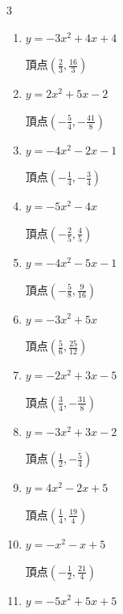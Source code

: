 \begin{multicols}{3}
\begin{enumerate}
        $\displaystyle 頂点\left( 2 , -1 \right)$

  \item $\displaystyle y=-3x^{2}+4x+4$

        $\displaystyle 頂点\left( \frac{2}{3} , \frac{16}{3} \right)$

  \item $\displaystyle y=2x^{2}+5x-2$

        $\displaystyle 頂点\left( -\frac{5}{4} , -\frac{41}{8} \right)$

\columnbreak %

  \item $\displaystyle y=-4x^{2}-2x-1$

        $\displaystyle 頂点\left( -\frac{1}{4} , -\frac{3}{4} \right)$

  \item $\displaystyle y=-5x^{2}-4x$

        $\displaystyle 頂点\left( -\frac{2}{5} , \frac{4}{5} \right)$

  \item $\displaystyle y=-4x^{2}-5x-1$

        $\displaystyle 頂点\left( -\frac{5}{8} , \frac{9}{16} \right)$

  \item $\displaystyle y=-3x^{2}+5x$

        $\displaystyle 頂点\left( \frac{5}{6} , \frac{25}{12} \right)$

  \item $\displaystyle y=-2x^{2}+3x-5$

        $\displaystyle 頂点\left( \frac{3}{4} , -\frac{31}{8} \right)$

\columnbreak %

  \item $\displaystyle y=-3x^{2}+3x-2$

        $\displaystyle 頂点\left( \frac{1}{2} , -\frac{5}{4} \right)$

  \item $\displaystyle y=4x^{2}-2x+5$

        $\displaystyle 頂点\left( \frac{1}{4} , \frac{19}{4} \right)$

  \item $\displaystyle y=-x^{2}-x+5$

        $\displaystyle 頂点\left( -\frac{1}{2} , \frac{21}{4} \right)$

  \item $\displaystyle y=-5x^{2}+5x+5$


\end{enumerate}
\end{multicols}
